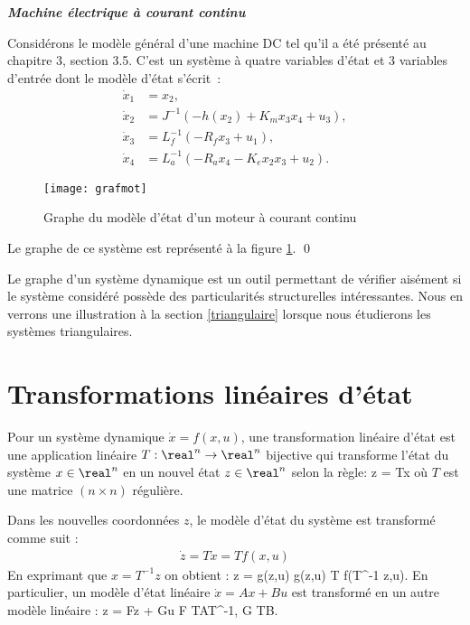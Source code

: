 \begin{exemple}{\bf \em Machine électrique à courant continu}

Considérons le modèle général d'une machine DC tel qu'il a été présenté au chapitre 3, section 3.5. C'est un système à quatre variables d'état et 3 variables d'entrée dont le modèle d'état s'écrit~:
\begin{equation*} \begin{split}
\dot x_1 &= x_2, \\
\dot x_2 &= J^{-1}( -h(x_2) + K_mx_3x_4 + u_3), \\
\dot x_3 &= L_f^{-1}(-R_fx_3 + u_1 ), \\
\dot x_4 &= L_a^{-1}(-R_ax_4 - K_ex_2x_3 + u_2).
\end{split} \end{equation*} 
\begin{figure}[htbp] 
   \centering
   \texttt{[image: grafmot]} 
   \caption{Graphe du modèle d'état d'un moteur à courant continu}
   \label{Fig:grafmot}
\end{figure}
Le graphe de ce système est représenté à la figure \ref{Fig:grafmot}. \qed
\end{exemple}
Le graphe d'un système dynamique est un outil permettant de vérifier aisément si le système considéré possède des particularités structurelles intéressantes. Nous en verrons une illustration à la section \ref{triangulaire} lorsque nous étudierons les systèmes triangulaires.

\section{Transformations linéaires d'état}

Pour un système dynamique $\dot x = f(x,u)$, une transformation
linéaire d'état est une application linéaire $T : \real^n
\rightarrow \real^n$ bijective qui transforme l'état du système
$x \in \real^n$ en un nouvel état $z \in \real^n$ selon la règle:
\eqnn
z = Tx
\eeqnn
où $T$ est une matrice $(n \times n)$ régulière.

Dans les nouvelles coordonnées $z$, le modèle d'état du
système est transformé comme suit :
\begin{equation*} \begin{split}
\dot z = T \dot x = Tf(x,u)
\end{split} \end{equation*}
En exprimant que $x= T^{-1}z$ on obtient :
\eqnn
\dot z = g(z,u) \hd {} \hd g(z,u) \triangleq T f(T^{-1} z,u).
\eeqnn
En particulier, un modèle d'état linéaire $\dot x = Ax + Bu$
est transformé en un autre modèle linéaire :
\eqnn
\dot z = Fz + Gu \hd
{} \hd F \triangleq TAT^{-1}, \;\;   G \triangleq TB.
\eeqnn

